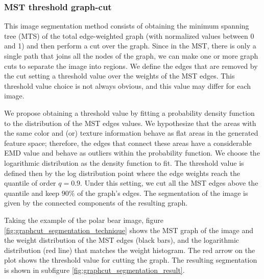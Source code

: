 \subsubsection{MST threshold graph-cut}

This image segmentation method consists of obtaining the minimum spanning tree (MTS) of the total edge-weighted graph (with normalized values between 0 and 1) and then perform a cut over the graph. Since in the MST, there is only a single path that joins all the nodes of the graph, we can make one or more graph cuts to separate the image into regions. We define the edges that are removed by the cut setting a threshold value over the weights of the MST edges. This threshold value choice is not always obvious, and this value may differ for each image.

We propose obtaining a threshold value by fitting a probability density function to the distribution of the MST edges values. We hypothesize that the areas with the same color and (or) texture information behave as flat areas in the generated feature space; therefore, the edges that connect these areas have a considerable EMD value and behave as outliers within the probability function. We choose the logarithmic distribution as the density function to fit. The threshold value is defined then by the log distribution point where the edge weights reach the quantile of order $q = 0.9$. Under this setting, we cut all the MST edges above the quantile and keep $90\%$ of the graph's edges. The segmentation of the image is given by the connected components of the resulting graph.

Taking the example of the polar bear image, figure \ref{fig:graphcut_segmentation_technique}  shows the MST graph of the image and the weight distribution of the MST edges (black bars), and the logarithmic distribution (red line) that matches the weight histogram. The red arrow on the plot shows the threshold value for cutting the graph. The resulting segmentation is shown in subfigure \ref{fig:graphcut_segmentation_result}.

